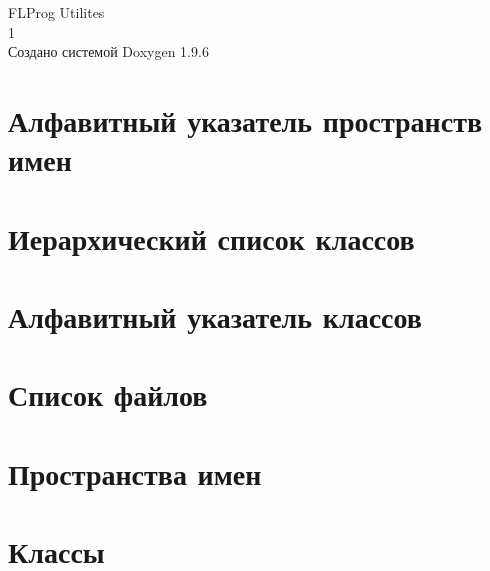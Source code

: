 \documentclass[twoside]{book}
\newcommand{\+}{\discretionary{\mbox{\scriptsize$\hookleftarrow$}}{}{}}
\newcommand{\clearemptydoublepage}{%
    \newpage{\pagestyle{empty}\cleardoublepage}%
  }
\begin{document}
  \raggedbottom
    \hypersetup{pageanchor=false,
                bookmarksnumbered=true,
                pdfencoding=unicode
               }
  \begin{titlepage}
  \vspace*{7cm}
  \begin{center}%
  {\Large FLProg Utilites}\\
  [1ex]\large 1 \\
  \vspace*{1cm}
  {\large Создано системой Doxygen 1.9.6}\\
  \end{center}
  \end{titlepage}
  \clearemptydoublepage
  \tableofcontents
  \clearemptydoublepage
  \hypersetup{pageanchor=true}
\chapter{Алфавитный указатель пространств имен}

\chapter{Иерархический список классов}

\chapter{Алфавитный указатель классов}

\chapter{Список файлов}

\chapter{Пространства имен}

\chapter{Классы}








\end{document}
